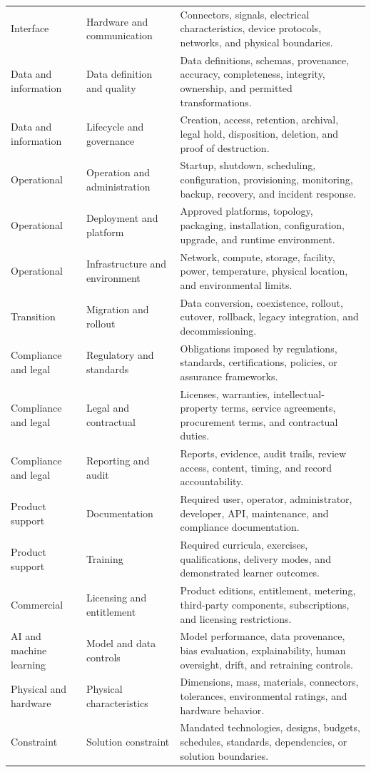 \begin{tabularx}{\linewidth}{L{3.0cm}L{4.0cm}Y}
Interface & Hardware and communication & Connectors, signals, electrical characteristics, device protocols, networks, and physical boundaries.\\
Data and information & Data definition and quality & Data definitions, schemas, provenance, accuracy, completeness, integrity, ownership, and permitted transformations.\\
Data and information & Lifecycle and governance & Creation, access, retention, archival, legal hold, disposition, deletion, and proof of destruction.\\
Operational & Operation and administration & Startup, shutdown, scheduling, configuration, provisioning, monitoring, backup, recovery, and incident response.\\
Operational & Deployment and platform & Approved platforms, topology, packaging, installation, configuration, upgrade, and runtime environment.\\
Operational & Infrastructure and environment & Network, compute, storage, facility, power, temperature, physical location, and environmental limits.\\
Transition & Migration and rollout & Data conversion, coexistence, rollout, cutover, rollback, legacy integration, and decommissioning.\\
Compliance and legal & Regulatory and standards & Obligations imposed by regulations, standards, certifications, policies, or assurance frameworks.\\
Compliance and legal & Legal and contractual & Licenses, warranties, intellectual-property terms, service agreements, procurement terms, and contractual duties.\\
Compliance and legal & Reporting and audit & Reports, evidence, audit trails, review access, content, timing, and record accountability.\\
Product support & Documentation & Required user, operator, administrator, developer, API, maintenance, and compliance documentation.\\
Product support & Training & Required curricula, exercises, qualifications, delivery modes, and demonstrated learner outcomes.\\
Commercial & Licensing and entitlement & Product editions, entitlement, metering, third-party components, subscriptions, and licensing restrictions.\\
AI and machine learning & Model and data controls & Model performance, data provenance, bias evaluation, explainability, human oversight, drift, and retraining controls.\\
Physical and hardware & Physical characteristics & Dimensions, mass, materials, connectors, tolerances, environmental ratings, and hardware behavior.\\
Constraint & Solution constraint & Mandated technologies, designs, budgets, schedules, standards, dependencies, or solution boundaries.\\
\end{tabularx}
\normalsize

